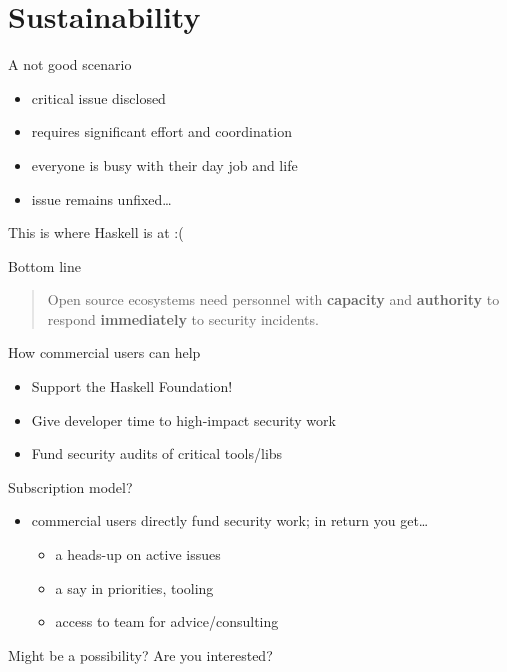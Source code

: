 \documentclass[ignorenonframetext,aspectratio=169,12pt]{beamer}
\begin{document}
\section{Sustainability}

\begin{frame}{A not good scenario}
  \begin{itemize}
    \item critical issue disclosed
    \item requires significant effort and coordination
    \item everyone is busy with their day job and life
    \item issue remains unfixed\ldots{}
  \end{itemize}

  This is where Haskell is at :(
\end{frame}

\begin{frame}{Bottom line}
\large
\begin{quote}
\raggedright
  Open source ecosystems need personnel with {\bf capacity} and
  {\bf authority} to respond {\bf immediately} to security incidents.
\end{quote}
\end{frame}

\begin{frame}{How commercial users can help}
  \begin{itemize}
    \item Support the Haskell Foundation!
    \item Give developer time to high-impact security work
    \item Fund security audits of critical tools/libs
  \end{itemize}
\end{frame}

\begin{frame}{Subscription model?}
  \begin{itemize}
        \item commercial users directly fund security work; in
          return you get…
          \begin{itemize}
            \item a heads-up on active issues
            \item a say in priorities, tooling
            \item access to team for advice/consulting
          \end{itemize}
  \end{itemize}

  Might be a possibility?  Are you interested?
\end{frame}
\end{document}
